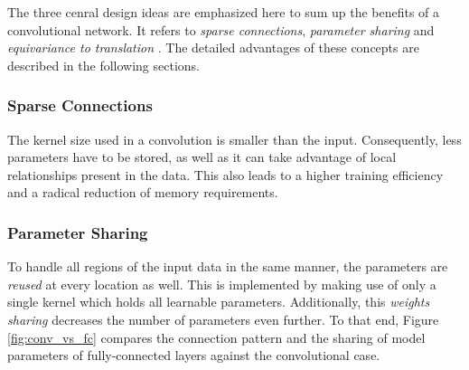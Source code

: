 The three cenral design ideas are emphasized here to sum up the benefits of a convolutional network. It refers to \textit{sparse connections}, \textit{parameter sharing} and \textit{equivariance to translation} \parencite[p. 336ff.]{deep_learning}. The detailed advantages of these concepts are described in the following sections.

\subsubsection*{Sparse Connections}
The kernel size used in a convolution is smaller than the input. Consequently, less parameters have to be stored, as well as it can take advantage of local relationships present in the data. This also leads to a higher training efficiency and a radical reduction of memory requirements.

\subsubsection*{Parameter Sharing}
To handle all regions of the input data in the same manner, the parameters are \textit{reused} at every location as well. This is implemented by making use of only a single kernel which holds all learnable parameters.  Additionally, this \textit{weights sharing} decreases the number of parameters even further. To that end, Figure \ref{fig:conv_vs_fc} compares the connection pattern  and the sharing of model parameters of fully-connected layers against the convolutional case.

